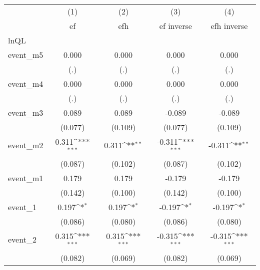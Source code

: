 {
\def\sym#1{\ifmmode^{#1}\else\(^{#1}\)\fi}
\begin{tabular}{l*{4}{c}}
\hline\hline
            &\multicolumn{1}{c}{(1)}&\multicolumn{1}{c}{(2)}&\multicolumn{1}{c}{(3)}&\multicolumn{1}{c}{(4)}\\
            &\multicolumn{1}{c}{ef}&\multicolumn{1}{c}{efh}&\multicolumn{1}{c}{ef inverse}&\multicolumn{1}{c}{efh inverse}\\
\hline
lnQL        &                     &                     &                     &                     \\
event\_m5    &       0.000         &       0.000         &       0.000         &       0.000         \\
            &         (.)         &         (.)         &         (.)         &         (.)         \\
[1em]
event\_m4    &       0.000         &       0.000         &       0.000         &       0.000         \\
            &         (.)         &         (.)         &         (.)         &         (.)         \\
[1em]
event\_m3    &       0.089         &       0.089         &      -0.089         &      -0.089         \\
            &     (0.077)         &     (0.109)         &     (0.077)         &     (0.109)         \\
[1em]
event\_m2    &       0.311\sym{***}&       0.311\sym{**} &      -0.311\sym{***}&      -0.311\sym{**} \\
            &     (0.087)         &     (0.102)         &     (0.087)         &     (0.102)         \\
[1em]
event\_m1    &       0.179         &       0.179         &      -0.179         &      -0.179         \\
            &     (0.142)         &     (0.100)         &     (0.142)         &     (0.100)         \\
[1em]
event\_1     &       0.197\sym{*}  &       0.197\sym{*}  &      -0.197\sym{*}  &      -0.197\sym{*}  \\
            &     (0.086)         &     (0.080)         &     (0.086)         &     (0.080)         \\
[1em]
event\_2     &       0.315\sym{***}&       0.315\sym{***}&      -0.315\sym{***}&      -0.315\sym{***}\\
            &     (0.082)         &     (0.069)         &     (0.082)         &     (0.069)         \\

\end{tabular}}
